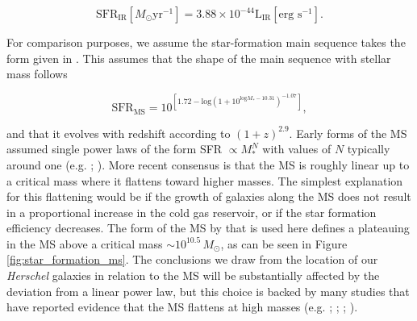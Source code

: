 \begin{equation}
	\textrm{SFR}_{\textrm{IR}} [M_\odot\textrm{yr}^{-1}] = 3.88\times10^{-44}\textrm{L}_{\textrm{IR}} [\textrm{erg s}^{-1}].
	\label{eq:LIR_SFR_calibration}
\end{equation}

For comparison purposes, we assume the star-formation main sequence takes the form given in \citealt{Scoville_2017}. This assumes that the shape of the main sequence with stellar mass follows 

\begin{equation}
	\textrm{SFR}_{\textrm{MS}} = 10^{[1.72-\textrm{log}(1+10^{\textrm{log}M_*-10.31})^{-1.07}]},
	\label{eq:scoville_ms}
\end{equation}

\noindent and that it evolves with redshift according to $(1+z)^{2.9}$. Early forms of the MS assumed single power laws of the form SFR $\propto M_*^N$ with values of $N$ typically around one (e.g. \citealt{Daddi_2007}; \citealt{Elbaz_2007}). More recent consensus is that the MS is roughly linear up to a critical mass where it flattens toward higher masses. The simplest explanation for this flattening would be if the growth of galaxies along the MS does not result in a proportional increase in the cold gas reservoir, or if the star formation efficiency decreases. The form of the MS by \citealt{Scoville_2017} that is used here defines a plateauing in the MS above a critical mass $\sim 10^{10.5}\,M_\odot$, as can be seen in Figure \ref{fig:star_formation_ms}. The conclusions we draw from the location of our \textit{Herschel} galaxies in relation to the MS will be substantially affected by the deviation from a linear power law, but this choice is backed by many studies that have reported evidence that the MS flattens at high masses (e.g. \citealt{Magnelli_2014}; \citealt{Whitaker_2014}; \citealt{Schreiber_2015}; \citealt{Tomczak_2016}).

